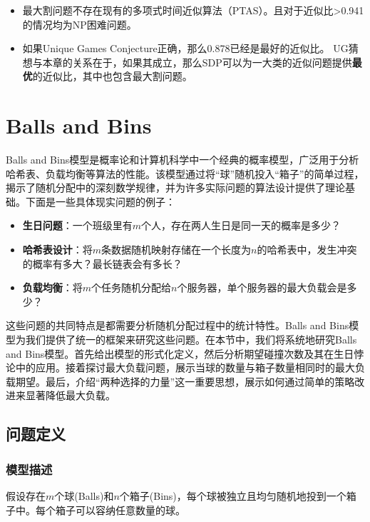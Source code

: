 \documentclass[lang=cn,newtx,10pt,scheme=chinese,chinesefont=nofont,citestyle=gb7714-2015, bibstyle=gb7714-2015]{elegantbook}
\begin{document}
\begin{refsection}
\begin{itemize}
    \item 最大割问题不存在现有的多项式时间近似算法（PTAS）。且对于近似比>0.941的情况均为NP困难问题。
    \item 如果Unique Games Conjecture正确，那么0.878已经是最好的近似比。
        UG猜想与本章的关系在于，如果其成立，那么SDP可以为一大类的近似问题提供\textbf{最优}的近似比，其中也包含最大割问题\cite{khot2002power}。
\end{itemize}

\section{Balls and Bins}
Balls and Bins模型是概率论和计算机科学中一个经典的概率模型，广泛用于分析哈希表、负载均衡等算法的性能。该模型通过将“球”随机投入“箱子”的简单过程，揭示了随机分配中的深刻数学规律，并为许多实际问题的算法设计提供了理论基础。下面是一些具体现实问题的例子：
\begin{itemize}
\item \textbf{生日问题}：一个班级里有$m$个人，存在两人生日是同一天的概率是多少？
\item \textbf{哈希表设计}：将$m$条数据随机映射存储在一个长度为$n$的哈希表中，发生冲突的概率有多大？最长链表会有多长？
\item \textbf{负载均衡}：将$m$个任务随机分配给$n$个服务器，单个服务器的最大负载会是多少？
\end{itemize}

这些问题的共同特点是都需要分析随机分配过程中的统计特性。Balls and Bins模型为我们提供了统一的框架来研究这些问题。在本节中，我们将系统地研究Balls and Bins模型。首先给出模型的形式化定义，然后分析期望碰撞次数及其在生日悖论中的应用。接着探讨最大负载问题，展示当球的数量与箱子数量相同时的最大负载期望。最后，介绍“两种选择的力量”这一重要思想，展示如何通过简单的策略改进来显著降低最大负载。

\subsection{问题定义}

\subsubsection{模型描述}
假设存在$m$个球(Balls)和$n$个箱子(Bins)，每个球被独立且均匀随机地投到一个箱子中。每个箱子可以容纳任意数量的球。


\end{refsection}
\end{document}
